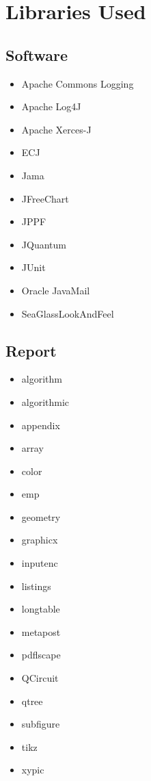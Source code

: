 





\chapter{Libraries Used}
\label{sec:libraries}

\section{Software}
\label{sec:appsoftlibs}
\begin{itemize}
 \item Apache Commons Logging\cite{commonlogging}
 \item Apache Log4J\cite{log4jweb}
 \item Apache Xerces-J\cite{xercesj}
 \item ECJ\cite{ecjtool}
 \item Jama\cite{javamatrix}
 \item JFreeChart\cite{jfreechart}
 \item JPPF\cite{jppfweb}
 \item JQuantum\cite{jquantum}
 \item JUnit\cite{junitweb}
 \item Oracle JavaMail\cite{javamail}
 \item SeaGlassLookAndFeel\cite{seaglass}
\end{itemize}

\section{Report}

\begin{itemize}
 \item algorithm\cite{algorithm}
 \item algorithmic\cite{algorithm}
 \item appendix\cite{appendix}
 \item array\cite{array}
 \item color\cite{color}
 \item emp\cite{emp}
 \item geometry\cite{geometry}
 \item graphicx\cite{graphicx}
 \item inputenc\cite{inputenc}
 \item listings\cite{listings}
 \item longtable\cite{longtable}
 \item metapost\cite{metapost}
 \item pdflscape\cite{pdflscape}
 \item QCircuit\cite{QCsite}
 \item qtree\cite{qtree}
 \item subfigure\cite{subfigure}
 \item tikz\cite{tikz}
 \item xypic\cite{xypiclatex}
\end{itemize}


